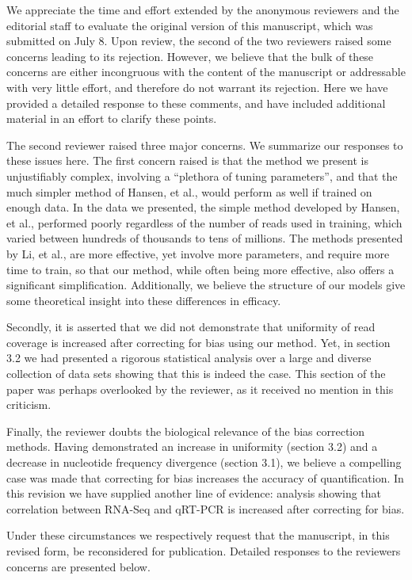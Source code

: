 \documentclass{article}
\begin{document}
We appreciate the time and effort extended by the anonymous reviewers and the
editorial staff to evaluate the original version of this manuscript, which was
submitted on July 8. Upon review, the second of the two reviewers raised some
concerns leading to its rejection. However, we believe that the bulk of these
concerns are either incongruous with the content of the manuscript or
addressable with very little effort, and therefore do not warrant its rejection.
Here we have provided a detailed response to these comments, and have included
additional material in an effort to clarify these points.

The second reviewer raised three major concerns. We summarize our
responses to these issues here.  The first concern raised is
that the method we present is unjustifiably complex, involving a ``plethora of
tuning parameters'', and that the much simpler method of Hansen, et al., would
perform as well if trained on enough data.  In the data we presented, the simple
method developed by Hansen, et al., performed poorly regardless of the number of
reads used in training, which varied between hundreds of thousands to tens of
millions.  The methods presented by Li, et al., are more effective, yet involve
more parameters, and require more time to train, so that our method, while often
being more effective, also offers a significant simplification.
Additionally, we believe the structure of our models give some
theoretical insight into these differences in efficacy.

Secondly, it is asserted that we did not demonstrate that uniformity of read
coverage is increased after correcting for bias using our method.  Yet, in
section 3.2 we had presented a rigorous statistical analysis over a large and
diverse collection of data sets showing that this is indeed the case. This
section of the paper was perhaps overlooked by the reviewer, as it received
no mention in this criticism.

Finally, the reviewer doubts the biological relevance of the bias correction
methods. Having demonstrated an increase in uniformity (section 3.2) and a
decrease in nucleotide frequency divergence (section 3.1), we believe a
compelling case was made that correcting for bias increases the accuracy of
quantification. In this revision we have supplied another line of evidence:
analysis showing that correlation between RNA-Seq and qRT-PCR is increased after
correcting for bias.

Under these circumstances we respectively request that the manuscript, in this
revised form, be reconsidered for publication.  Detailed responses to
the reviewers concerns are presented below.
\end{document}
